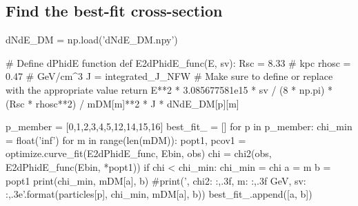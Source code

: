 \documentclass[10pt, oneside]{book}
\numberwithin{equation}{chapter}
\begin{document}
\subsection{Find the best-fit cross-section}
\begin{python}
dNdE_DM = np.load('dNdE_DM.npy')

# Define dPhidE function
def E2dPhidE_func(E, sv):
    Rsc = 8.33  # kpc
    rhosc = 0.47  # GeV/cm^3
    J = integrated_J_NFW  # Make sure to define or replace with the appropriate value
    return E**2 * 3.085677581e15 * sv / (8 * np.pi) * (Rsc * rhosc**2) / mDM[m]**2 * J * dNdE_DM[p][m]

p_member = [0,1,2,3,4,5,12,14,15,16]
best_fit_ = []
for p in p_member:
    chi_min = float('inf')
    for m in range(len(mDM)):
        popt1, pcov1 = optimize.curve_fit(E2dPhidE_func, Ebin, obs)
        chi = chi2(obs, E2dPhidE_func(Ebin, *popt1))
        if chi < chi_min:
            chi_min = chi
            a = m
            b = popt1
    print(chi_min, mDM[a], b)
    #print('{}, chi2: {:,.3f}, m: {:,.3f} GeV, sv: {:,.3e}'.format(particles[p], chi_min, mDM[a], b))
    best_fit_.append([a, b])
\end{python}
\end{document}
